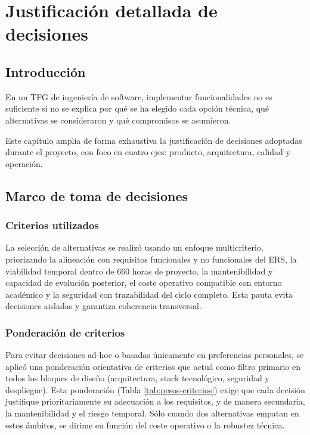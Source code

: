 \chapter{Justificaci\'on detallada de decisiones}\label{justificacion}
\makeatletter
{}
\makeatother

\FloatBarrier
\section{Introducci\'on}

En un TFG de ingenier\'ia de software, implementar funcionalidades no es suficiente
si no se explica por qu\'e se ha elegido cada opci\'on t\'ecnica,
qu\'e alternativas se consideraron y qu\'e compromisos se asumieron.

Este cap\'itulo ampl\'ia de forma exhaustiva la justificaci\'on de decisiones
adoptadas durante el proyecto,
con foco en cuatro ejes: producto, arquitectura, calidad y operaci\'on.

\FloatBarrier
\section{Marco de toma de decisiones}

\subsection{Criterios utilizados}

La selecci\'on de alternativas se realiz\'o usando un enfoque multicriterio, priorizando la alineaci\'on con requisitos funcionales y no funcionales del ERS, la viabilidad temporal dentro de 660 horas de proyecto, la mantenibilidad y capacidad de evoluci\'on posterior, el coste operativo compatible con entorno acad\'emico y la seguridad con trazabilidad del ciclo completo. Esta pauta evita decisiones aisladas y garantiza coherencia transversal.

\subsection{Ponderaci\'on de criterios}

Para evitar decisiones ad-hoc o basadas \'unicamente en preferencias personales, se aplic\'o una ponderaci\'on orientativa de criterios que actu\'a como filtro primario en todos los bloques de dise\~no (arquitectura, stack tecnol\'ogico, seguridad y despliegue). Esta ponderaci\'on (Tabla \ref{tab:pesos-criterios}) exige que cada decisi\'on justifique prioritariamente su adecuaci\'on a los requisitos, y de manera secundaria, la mantenibilidad y el riesgo temporal. S\'olo cuando dos alternativas empatan en estos \'ambitos, se dirime en funci\'on del coste operativo o la robustez t\'ecnica.

